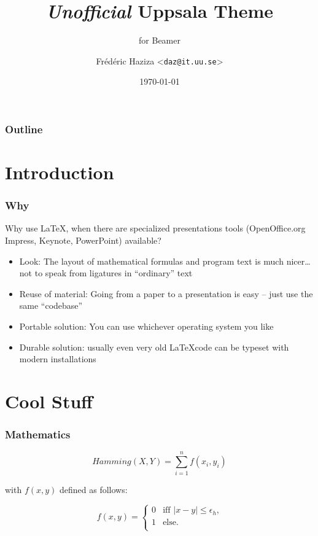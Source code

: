 \documentclass{beamer}
\title{\emph{Unofficial} Uppsala Theme}
\subtitle{for Beamer}
\author[Fr\'ed\'eric Haziza | \emph{daz@it.uu.se}] %
{Fr\'ed\'eric Haziza <\texttt{daz@it.uu.se}>}
\institute[Dept. of Information Technology] %
{
  Department of Computer Systems\\
  Uppsala University
}
\date[DEMO] %
{\today}
\begin{document}
\begin{frame}[plain] %
  \titlepage
\end{frame}

\begin{frame}
    \frametitle{Outline}
    \tableofcontents[currentsection]
\end{frame}

\section{Introduction}

\begin{frame}
  \frametitle{Why}

  Why use \LaTeX, when there are specialized presentations tools (OpenOffice.org Impress, Keynote, PowerPoint) available?

  \begin{itemize}
    \item{Look: The layout of mathematical formulas and program text is much nicer\ldots not to speak from ligatures in ``ordinary'' text}
    \item{Reuse of material: Going from a paper to a presentation is easy -- just use the same ``codebase''}
    \item{Portable solution: You can use whichever operating system you like}
    \item{Durable solution: usually even very old \LaTeX code can be typeset with modern installations}
  \end{itemize}

\end{frame}

\section{Cool Stuff}

\begin{frame}
  \frametitle{Mathematics}

  \begin{example}
    \begin{equation}
      \mathit{Hamming} (X,Y) = \sum_{i=1}^{n} f (x_{i}, y_{i})
    \end{equation}
  \end{example}

with $f(x,y)$ defined as follows:

  \begin{definition}
    \begin{equation}
      f(x,y)= \left\{ \begin{array}{ll}
          0 & \mbox{iff $|x-y| \leq \epsilon_{h}$,} \\
          1 & \mbox{else.}      \\
        \end{array}
      \right.
    \end{equation}
  \end{definition}

\end{frame}
\end{document}
